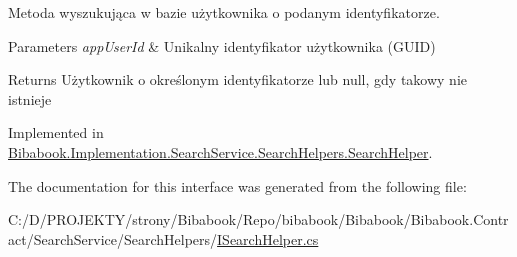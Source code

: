 Metoda wyszukująca w bazie użytkownika o podanym identyfikatorze. 


\begin{DoxyParams}{Parameters}
{\em app\+User\+Id} & Unikalny identyfikator użytkownika (G\+U\+I\+D)\\
\hline
\end{DoxyParams}
\begin{DoxyReturn}{Returns}
Użytkownik o określonym identyfikatorze lub null, gdy takowy nie istnieje
\end{DoxyReturn}


Implemented in \hyperlink{class_bibabook_1_1_implementation_1_1_search_service_1_1_search_helpers_1_1_search_helper_a8b39cc678b93c48100fb0f8be980cc5c}{Bibabook.\+Implementation.\+Search\+Service.\+Search\+Helpers.\+Search\+Helper}.



The documentation for this interface was generated from the following file\+:\begin{DoxyCompactItemize}
\item 
C\+:/\+D/\+P\+R\+O\+J\+E\+K\+T\+Y/strony/\+Bibabook/\+Repo/bibabook/\+Bibabook/\+Bibabook.\+Contract/\+Search\+Service/\+Search\+Helpers/\hyperlink{_i_search_helper_8cs}{I\+Search\+Helper.\+cs}\end{DoxyCompactItemize}

